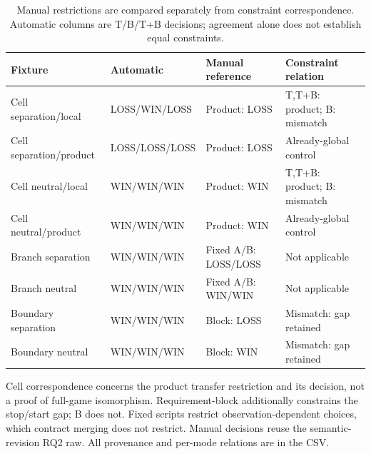 \begin{table}[t]
\centering\small
\caption{Manual restrictions are compared separately from constraint correspondence. Automatic columns are T/B/T+B decisions; agreement alone does not establish equal constraints.}
\begin{tabular}{llll}
\toprule
Fixture & Automatic & Manual reference & Constraint relation \\
\midrule
Cell separation/local & LOSS/WIN/LOSS & Product: LOSS & T,T+B: product; B: mismatch \\
Cell separation/product & LOSS/LOSS/LOSS & Product: LOSS & Already-global control \\
Cell neutral/local & WIN/WIN/WIN & Product: WIN & T,T+B: product; B: mismatch \\
Cell neutral/product & WIN/WIN/WIN & Product: WIN & Already-global control \\
Branch separation & WIN/WIN/WIN & Fixed A/B: LOSS/LOSS & Not applicable \\
Branch neutral & WIN/WIN/WIN & Fixed A/B: WIN/WIN & Not applicable \\
Boundary separation & WIN/WIN/WIN & Block: LOSS & Mismatch: gap retained \\
Boundary neutral & WIN/WIN/WIN & Block: WIN & Mismatch: gap retained \\
\bottomrule
\end{tabular}
\par\footnotesize Cell correspondence concerns the product transfer restriction and its decision, not a proof of full-game isomorphism. Requirement-block additionally constrains the stop/start gap; B does not. Fixed scripts restrict observation-dependent choices, which contract merging does not restrict. Manual decisions reuse the semantic-revision RQ2 raw. All provenance and per-mode relations are in the CSV.
\end{table}

